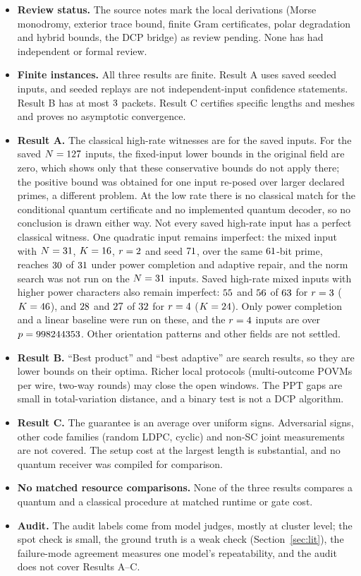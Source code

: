 \documentclass[10pt]{article}
\begin{document}
\begin{itemize}
\item \textbf{Review status.} The source notes mark the local derivations (Morse monodromy, exterior trace bound, finite Gram certificates, polar degradation and hybrid bounds, the DCP bridge) as review pending. None has had independent or formal review.
\item \textbf{Finite instances.} All three results are finite. Result A uses saved seeded inputs, and seeded replays are not independent-input confidence statements. Result B has at most $3$ packets. Result C certifies specific lengths and meshes and proves no asymptotic convergence.
\item \textbf{Result A.} The classical high-rate witnesses are for the saved inputs. For the saved $N=127$ inputs, the fixed-input lower bounds in the original field are zero, which shows only that these conservative bounds do not apply there; the positive bound was obtained for one input re-posed over larger declared primes, a different problem. At the low rate there is no classical match for the conditional quantum certificate and no implemented quantum decoder, so no conclusion is drawn either way. Not every saved high-rate input has a perfect classical witness. One quadratic input remains imperfect: the mixed input with $N=31$, $K=16$, $r=2$ and seed $71$, over the same $61$-bit prime, reaches $30$ of $31$ under power completion and adaptive repair, and the norm search was not run on the $N=31$ inputs. Saved high-rate mixed inputs with higher power characters also remain imperfect: $55$ and $56$ of $63$ for $r=3$ ($K=46$), and $28$ and $27$ of $32$ for $r=4$ ($K=24$). Only power completion and a linear baseline were run on these, and the $r=4$ inputs are over $p=998244353$. Other orientation patterns and other fields are not settled.
\item \textbf{Result B.} ``Best product'' and ``best adaptive'' are search results, so they are lower bounds on their optima. Richer local protocols (multi-outcome POVMs per wire, two-way rounds) may close the open windows. The PPT gaps are small in total-variation distance, and a binary test is not a DCP algorithm.
\item \textbf{Result C.} The guarantee is an average over uniform signs. Adversarial signs, other code families (random LDPC, cyclic) and non-SC joint measurements are not covered. The setup cost at the largest length is substantial, and no quantum receiver was compiled for comparison.
\item \textbf{No matched resource comparisons.} None of the three results compares a quantum and a classical procedure at matched runtime or gate cost.
\item \textbf{Audit.} The audit labels come from model judges, mostly at cluster level; the spot check is small, the ground truth is a weak check (Section~\ref{sec:lit}), the failure-mode agreement measures one model's repeatability, and the audit does not cover Results A--C.
\end{itemize}
\end{document}
